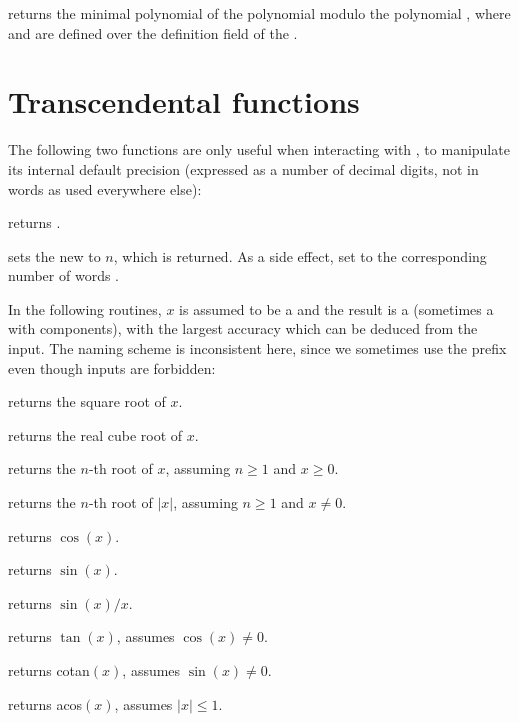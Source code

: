  returns the minimal
polynomial of the polynomial  modulo the polynomial , where
 and  are defined over the definition field of the 
.

\section{Transcendental functions}

The following two functions are only useful when interacting with ,
to manipulate its internal default precision (expressed as a number of
decimal digits, not in words as used everywhere else):

 returns .

 sets the new
 to $n$, which is returned. As a side effect, set
 to the corresponding number of words .


In the following routines, $x$ is assumed to be a  and the result
is a  (sometimes a  with  components), with
the largest accuracy which can be deduced from the input. The naming scheme
is inconsistent here, since we sometimes use the prefix  even though
 inputs are forbidden:

 returns the square root of $x$.

 returns the real cube root of $x$.

 returns the $n$-th root of $x$, assuming
$n\geq 1$ and $x \geq 0$.

 returns the $n$-th root of $|x|$,
assuming $n\geq 1$ and $x \neq 0$.

 returns $\cos(x)$.

 returns $\sin(x)$.

 returns $\sin(x)/x$.

 returns $\tan(x)$, assumes $\cos(x)\neq 0$.

 returns cotan$(x)$, assumes $\sin(x)\neq 0$.

%

 returns acos$(x)$, assumes $|x| \leq 1$.

